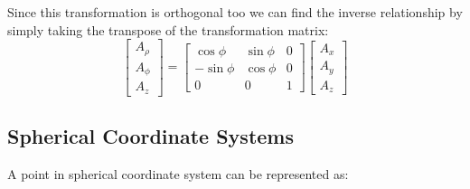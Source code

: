             Since this transformation is orthogonal too we can find the inverse relationship by simply taking the transpose of the transformation matrix:
            \begin{equation}
                \begin{bmatrix}
                    A_\rho \\ A_\phi \\ A_z
                \end{bmatrix}
                =
                \begin{bmatrix}
                    \cos\phi & \sin\phi & 0 \\
                    -\sin\phi & \cos\phi & 0 \\
                    0 & 0 & 1
                \end{bmatrix}
                \begin{bmatrix}
                    A_x \\ A_y \\ A_z
                \end{bmatrix}
            \end{equation}
        \subsection{Spherical Coordinate Systems}
            A point in spherical coordinate system can be represented as:
            